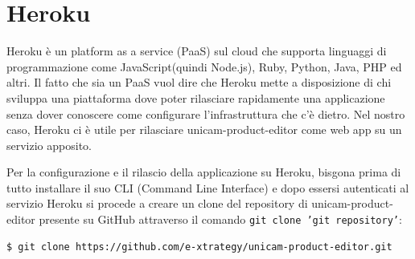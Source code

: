 \section{Heroku}
Heroku\cite{heroku} è un platform as a service (PaaS) sul cloud che supporta linguaggi di programmazione come JavaScript(quindi Node.js), Ruby, Python, Java, PHP ed altri.
Il fatto che sia un PaaS vuol dire che Heroku mette a disposizione di chi sviluppa una piattaforma dove poter rilasciare rapidamente una applicazione senza dover conoscere come configurare l’infrastruttura che c’è dietro.
Nel nostro caso, Heroku ci è utile per rilasciare unicam-product-editor come web app su un servizio apposito.

Per la configurazione e il rilascio della applicazione su Heroku, bisgona prima di tutto installare il suo CLI (Command Line Interface) e dopo essersi autenticati al servizio Heroku si procede a creare un clone del repository di unicam-product-editor presente su GitHub attraverso il comando \texttt{git clone 'git repository'}:

\begin{lstlisting}[style=javaScriptCode]
$ git clone https://github.com/e-xtrategy/unicam-product-editor.git
\end{lstlisting}

